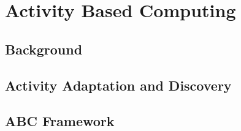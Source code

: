 \chapter{Activity Based Computing}

\section{Background}


\section{Activity Adaptation and Discovery}


\section{ABC Framework}